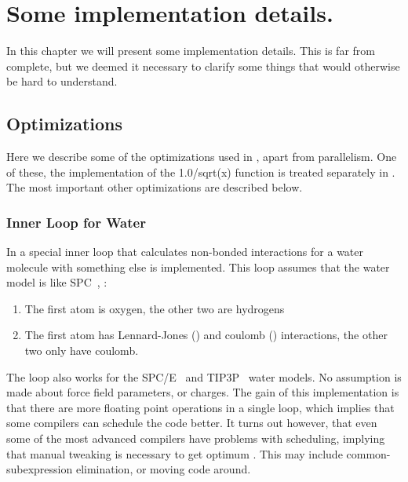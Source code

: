 %
% 
% 
% 
% 
% 
% 
% 
% 
%

\chapter{Some implementation details.}
In this chapter we will present some implementation details. This is
far from complete, but we deemed it necessary to clarify some things
that would otherwise be hard to understand.


\section{Optimizations}
Here we describe some of the optimizations used in {\gromacs}, apart
from parallelism. One of these, the implementation of the 
1.0/sqrt(x) function is treated separately in .
The most important other optimizations are described below.

\subsection{Inner Loop for Water}
In {\gromacs} a special inner loop that calculates non-bonded
interactions for a water molecule with something else is 
implemented. This loop assumes that the water model is like
SPC~\cite{Berendsen81}, {\ie}:
\begin{enumerate}
\item	The first atom is oxygen, the other two are hydrogens
\item	The first atom has Lennard-Jones () and 
	coulomb () interactions, the other
	two only have coulomb.
\end{enumerate}

The loop also works for the SPC/E~\cite{Berendsen87} and 
TIP3P~\cite{Jorgensen83} water models. No assumption is made about
force field parameters, or charges.
The gain of this implementation is that there are more floating point
operations in a single loop, which implies that some compilers
can schedule the code better. It turns out however, that even
some of the most advanced compilers have problems with scheduling, 
implying that manual tweaking is necessary to get optimum 
.
This may include common-subexpression elimination, or moving
code around. 

